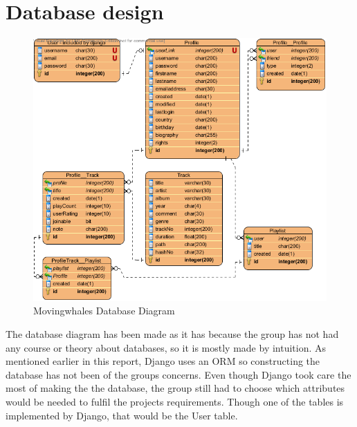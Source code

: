 \section{Database design}

\begin{figure}[h!]
\centering
\includegraphics[scale=0.5]{design/figures/mwdbdiagram}
\caption{Movingwhales Database Diagram}
\end{figure}


The database diagram has been made as it has because the group has not had any course or theory about databases, so it is mostly made by intuition. As mentioned earlier in this report, Django uses an ORM so constructing the database has not been of the groups concerns. Even though Django took care the most of making the the database, the group still had to choose which attributes would be needed to fulfil the projects requirements. Though one of the tables is implemented by Django, that would be the User table.  
